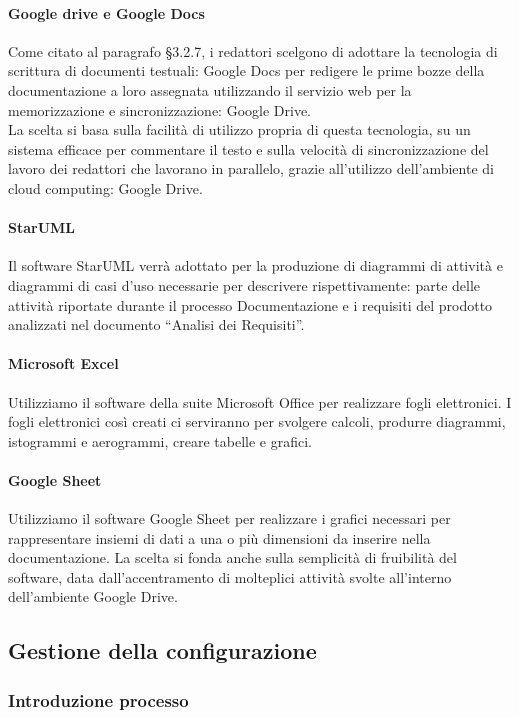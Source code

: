 			\paragraph{Google drive e Google Docs}
				Come citato al paragrafo §3.2.7, i redattori scelgono di adottare la tecnologia di scrittura di documenti testuali: Google Docs per redigere le prime bozze della documentazione a loro assegnata utilizzando il servizio web per la memorizzazione e sincronizzazione: Google Drive. \\
				La scelta si basa sulla facilità di utilizzo propria di questa tecnologia, su un sistema efficace per commentare il testo e sulla velocità di sincronizzazione del lavoro dei redattori che lavorano in parallelo, grazie all’utilizzo dell’ambiente di cloud computing: Google Drive. \\
			\paragraph{StarUML}
				Il software StarUML verrà adottato per la produzione di diagrammi di attività e diagrammi di casi d’uso necessarie per descrivere rispettivamente: parte delle attività riportate durante il processo Documentazione e i requisiti del prodotto analizzati nel documento “Analisi dei Requisiti”.
			\paragraph{Microsoft Excel}
				Utilizziamo il software della suite Microsoft Office per realizzare fogli elettronici. I fogli elettronici così creati ci serviranno per svolgere calcoli, produrre diagrammi, istogrammi e aerogrammi, creare tabelle e grafici.
			\paragraph{Google Sheet}
				Utilizziamo il software Google Sheet per realizzare i grafici necessari per rappresentare insiemi di dati a una o più dimensioni da inserire nella documentazione. La scelta si fonda anche sulla semplicità di fruibilità del software, data dall’accentramento di molteplici attività svolte all’interno dell’ambiente Google Drive.

	\subsection{Gestione della configurazione}
		\subsubsection{Introduzione processo}
